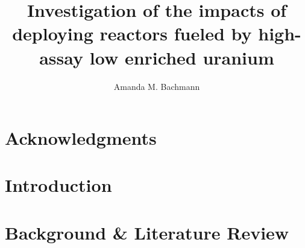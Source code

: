 \documentclass[edeposit,fullpage]{uiucthesis2018}
\title{Investigation of the impacts of deploying reactors fueled by high-assay low enriched uranium}
\author{Amanda M. Bachmann}
\begin{document}
\maketitle

\frontmatter
\begin{abstract}



\end{abstract}

\chapter*{Acknowledgments}




\tableofcontents
\listoftables
\listoffigures


\pagebreak
\mainmatter

\chapter{Introduction} \label{ch:intro}


\chapter{Background \& Literature Review} \label{ch:background}

\end{document}
